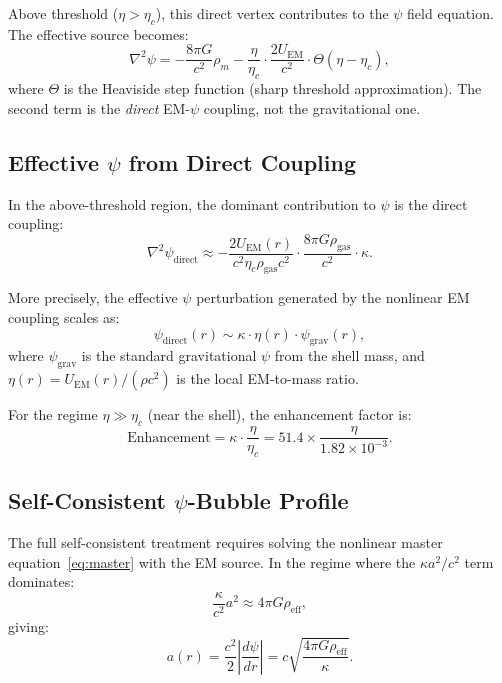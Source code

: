 \documentclass[amsmath,amssymb,aps,prd,superscriptaddress,nofootinbib]{revtex4-2}
\newcommand{\ka}{\kappa}
\begin{document}
Above threshold ($\eta > \eta_c$), this direct vertex contributes to the
$\psi$ field equation. The effective source becomes:
\begin{equation}
\nabla^2 \psi = -\frac{8\pi G}{c^2}\rho_m - \frac{\eta}{\eta_c} \cdot \frac{2 U_\text{EM}}{c^2} \cdot \Theta(\eta - \eta_c),
\end{equation}
where $\Theta$ is the Heaviside step function (sharp threshold
approximation). The second term is the \emph{direct} EM-$\psi$ coupling,
not the gravitational one.

\subsection{Effective $\psi$ from Direct Coupling}

In the above-threshold region, the dominant contribution to $\psi$ is the
direct coupling:
\begin{equation}
\nabla^2 \psi_\text{direct} \approx -\frac{2 U_\text{EM}(r)}{c^2 \eta_c \rho_\text{gas} c^2} \cdot \frac{8\pi G \rho_\text{gas}}{c^2} \cdot \ka.
\end{equation}

More precisely, the effective $\psi$ perturbation generated by the
nonlinear EM coupling scales as:
\begin{equation}\label{eq:psi-direct}
\psi_\text{direct}(r) \sim \ka \cdot \eta(r) \cdot \psi_\text{grav}(r),
\end{equation}
where $\psi_\text{grav}$ is the standard gravitational $\psi$ from the
shell mass, and $\eta(r) = U_\text{EM}(r)/(\rho c^2)$ is the local
EM-to-mass ratio.

For the regime $\eta \gg \eta_c$ (near the shell), the enhancement factor is:
\begin{equation}
\text{Enhancement} = \ka \cdot \frac{\eta}{\eta_c} = 51.4 \times \frac{\eta}{1.82 \times 10^{-3}}.
\end{equation}

\subsection{Self-Consistent $\psi$-Bubble Profile}

The full self-consistent treatment requires solving the nonlinear master
equation~\eqref{eq:master} with the EM source. In the regime where the
$\kappa a^2/c^2$ term dominates:
\begin{equation}
\frac{\ka}{c^2} a^2 \approx 4\pi G \rho_\text{eff},
\end{equation}
giving:
\begin{equation}
a(r) = \frac{c^2}{2}\left|\frac{d\psi}{dr}\right| = c\sqrt{\frac{4\pi G \rho_\text{eff}}{\ka}}.
\end{equation}
\end{document}
